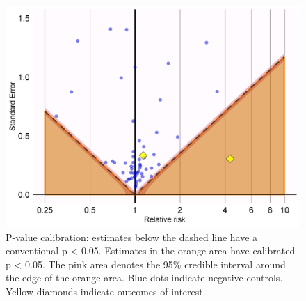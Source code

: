 \documentclass[11pt]{book}
\newenvironment{Shaded}{\begin{snugshade}}{\end{snugshade}}
\newcommand{\CommentTok}[1]{\textcolor[rgb]{0.56,0.35,0.01}{\textit{#1}}}
\newcommand{\DataTypeTok}[1]{\textcolor[rgb]{0.13,0.29,0.53}{#1}}
\newcommand{\KeywordTok}[1]{\textcolor[rgb]{0.13,0.29,0.53}{\textbf{#1}}}
\newcommand{\NormalTok}[1]{#1}
\newcommand{\OperatorTok}[1]{\textcolor[rgb]{0.81,0.36,0.00}{\textbf{#1}}}
\newcommand{\OtherTok}[1]{\textcolor[rgb]{0.56,0.35,0.01}{#1}}
\newcommand{\StringTok}[1]{\textcolor[rgb]{0.31,0.60,0.02}{#1}}
\theoremstyle{definition}
\theoremstyle{definition}
\theoremstyle{definition}
\theoremstyle{remark}
\begin{document}
\begin{Shaded}
\end{Shaded}

\begin{figure}

{\centering \includegraphics[width=0.7\linewidth]{images/MethodValidity/pValueCal} 

}

\caption{P-value calibration: estimates below the dashed line have a conventional p < 0.05. Estimates in the orange area have calibrated p < 0.05. The pink area denotes the 95\% credible interval around the edge of the orange area. Blue dots indicate negative controls. Yellow diamonds indicate outcomes of interest.}\label{fig:pValueCal}
\end{figure}
\end{document}
